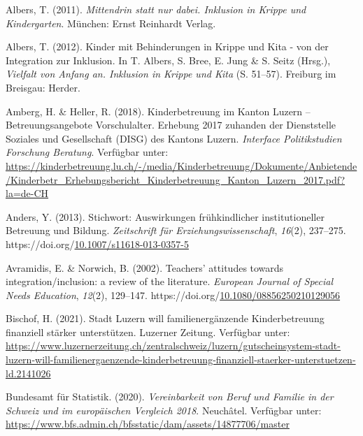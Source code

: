 \documentclass[
  ngerman,
  11pt,
  paper=a4,
  twoside,
  titlepage=true,
  openright,
  abstract=on,
  toc=listofnumbered,
  numbers=noenddot,
  chapterprefix=true,
  headings=optiontohead,
  svgnames,
  dvipsnames]{scrreprt}
\newlength{\cslhangindent}
\newlength{\cslentryspacingunit} %
\newenvironment{CSLReferences}[2] %
 {%
  \setlength{\parindent}{0pt}
  \ifodd #1
  \let\oldpar\par
  \def\par{\hangindent=\cslhangindent\oldpar}
  \fi
  \setlength{\parskip}{#2\cslentryspacingunit}
 }%
 {}
\begin{document}
\hypertarget{refs}{}
\begin{CSLReferences}{1}{0}
\leavevmode{}%
Albers, T. (2011). \emph{Mittendrin statt nur dabei. Inklusion in Krippe
und Kindergarten}. München: Ernst Reinhardt Verlag.

\leavevmode{}%
Albers, T. (2012). Kinder mit Behinderungen in Krippe und Kita - von der
Integration zur Inklusion. In T. Albers, S. Bree, E. Jung \& S. Seitz
(Hrsg.), \emph{Vielfalt von Anfang an. Inklusion in Krippe und Kita} (S.
51–57). Freiburg im Breisgau: Herder.

\leavevmode{}%
Amberg, H. \& Heller, R. (2018). Kinderbetreuung im Kanton Luzern –
Betreuungsangebote Vorschulalter. Erhebung 2017 zuhanden der
Dienststelle Soziales und Gesellschaft (DISG) des Kantons Luzern.
\emph{Interface Politikstudien Forschung Beratung}. Verfügbar unter:
\url{https://kinderbetreuung.lu.ch/-/media/Kinderbetreuung/Dokumente/Anbietende/Kinderbetr_Erhebungsbericht_Kinderbetreuung_Kanton_Luzern_2017.pdf?la=de-CH}

\leavevmode{}%
Anders, Y. (2013). Stichwort: {Auswirkungen} frühkindlicher
institutioneller {Betreuung} und {Bildung}. \emph{Zeitschrift für
Erziehungswissenschaft}, \emph{16}(2), 237–275.
https://doi.org/\href{https://doi.org/10.1007/s11618-013-0357-5}{10.1007/s11618-013-0357-5}

\leavevmode{}%
Avramidis, E. \& Norwich, B. (2002). Teachers’ attitudes towards
integration/inclusion: a review of the literature. \emph{European
Journal of Special Needs Education}, \emph{12}(2), 129–147.
https://doi.org/\href{https://doi.org/10.1080/08856250210129056}{10.1080/08856250210129056}

\leavevmode{}%
Bischof, H. (2021). Stadt Luzern will familienergänzende Kinderbetreuung
finanziell stärker unterstützen. Luzerner Zeitung. Verfügbar unter:
\url{https://www.luzernerzeitung.ch/zentralschweiz/luzern/gutscheinsystem-stadt-luzern-will-familienergaenzende-kinderbetreuung-finanziell-staerker-unterstuetzen-ld.2141026}

\leavevmode{}%
Bundesamt für Statistik. (2020). \emph{Vereinbarkeit von Beruf und
Familie in der Schweiz und im europäischen Vergleich 2018}. Neuchâtel.
Verfügbar unter:
\url{https://www.bfs.admin.ch/bfsstatic/dam/assets/14877706/master}


\end{CSLReferences}
\end{document}
